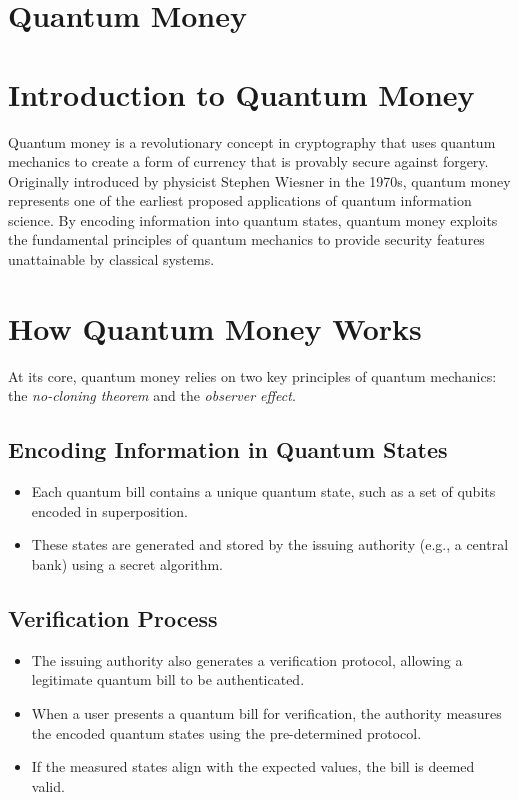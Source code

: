 \documentclass[11pt]{article}
\theoremstyle{definition}
\begin{document}
\section{Quantum Money}


\section*{Introduction to Quantum Money}
Quantum money is a revolutionary concept in cryptography that uses quantum mechanics to create a form of currency that is provably secure against forgery. Originally introduced by physicist Stephen Wiesner in the 1970s, quantum money represents one of the earliest proposed applications of quantum information science. By encoding information into quantum states, quantum money exploits the fundamental principles of quantum mechanics to provide security features unattainable by classical systems.

\section*{How Quantum Money Works}
At its core, quantum money relies on two key principles of quantum mechanics: the \textit{no-cloning theorem} and the \textit{observer effect}.

\subsection*{Encoding Information in Quantum States}
\begin{itemize}
    \item Each quantum bill contains a unique quantum state, such as a set of qubits encoded in superposition.
    \item These states are generated and stored by the issuing authority (e.g., a central bank) using a secret algorithm.
\end{itemize}

\subsection*{Verification Process}
\begin{itemize}
    \item The issuing authority also generates a verification protocol, allowing a legitimate quantum bill to be authenticated.
    \item When a user presents a quantum bill for verification, the authority measures the encoded quantum states using the pre-determined protocol.
    \item If the measured states align with the expected values, the bill is deemed valid.
\end{itemize}
\end{document}
